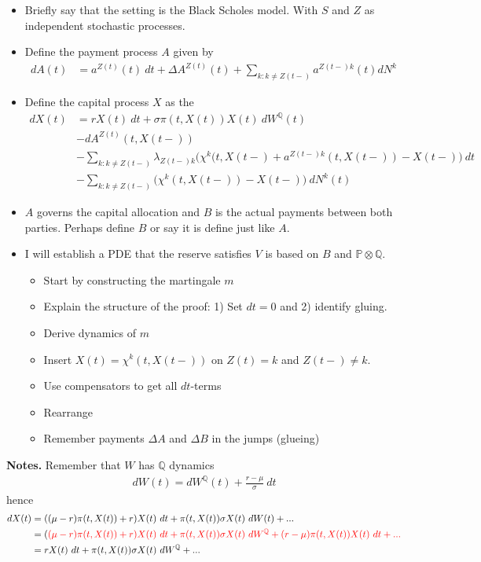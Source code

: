 \documentclass[
]{book}
\providecommand{\tightlist}{%
  \setlength{\itemsep}{0pt}\setlength{\parskip}{0pt}}
\begin{document}
\begin{itemize}
\tightlist
\item
  Briefly say that the setting is the Black Scholes model. With \(S\) and \(Z\) as independent stochastic processes.
\item
  Define the payment process \(A\) given by
  \begin{align*}
    dA(t)&=a^{Z(t)}(t)\ dt+\Delta A^{Z(t)}(t)+\sum_{k:k\ne Z(t-)}a^{Z(t-)k}(t)dN^k
    \end{align*}
\item
  Define the capital process \(X\) as the
  \begin{align*}
    dX(t)&=rX(t)\ dt+\sigma \pi(t,X(t))X(t)\ dW^{\mathbb Q}(t)\\
    &-dA^{Z(t)}(t,X(t-))\\
    &-\sum_{k:k\ne Z(t-)}\lambda_{Z(t-)k}\Big(\chi^k(t,X(t-)+a^{Z(t-)k}(t,X(t-))-X(t-)\Big)\ dt\\
    &-\sum_{k:k\ne Z(t-)}\Big(\chi^k(t,X(t-))-X(t-)\Big)\ dN^k(t)
    \end{align*}
\item
  \(A\) governs the capital allocation and \(B\) is the actual payments between both parties. Perhaps define \(B\) or say it is define just like \(A\).
\item
  I will establish a PDE that the reserve satisfies \(V\) is based on \(B\) and \(\mathbb P\otimes \mathbb Q\).

  \begin{itemize}
  \tightlist
  \item
    Start by constructing the martingale \(m\)
  \item
    Explain the structure of the proof: 1) Set \(dt=0\) and 2) identify gluing.
  \item
    Derive dynamics of \(m\)
  \item
    Insert \(X(t)=\chi^k(t,X(t-))\) on \(Z(t)=k\) and \(Z(t-)\ne k\).
  \item
    Use compensators to get all \(dt\)-terms
  \item
    Rearrange
  \item
    Remember payments \(\Delta A\) and \(\Delta B\) in the jumps (glueing)
  \end{itemize}
\end{itemize}

\textbf{Notes.} Remember that \(W\) has \(\mathbb Q\) dynamics
\begin{align*}
dW(t)=dW^\mathbb Q(t)+\frac{r-\mu}{\sigma}\ dt
\end{align*}
hence
\begin{align*}
dX(t)&=((\mu-r)\pi(t,X(t))+r)X(t)\ dt+\pi(t,X(t))\sigma X(t)\ dW(t)+...\\
&=(\color{red}{(\mu-r)\pi(t,X(t))}+r)X(t)\ dt+\pi(t,X(t))\sigma X(t)\ dW^\mathbb Q+\color{red}{(r-\mu)\pi(t,X(t))}X(t)\ dt+...\\
&=rX(t)\ dt+\pi(t,X(t))\sigma X(t)\ dW^\mathbb Q+...
\end{align*}
\end{document}
